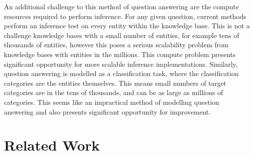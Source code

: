\noindent An additional challenge to this method of question answering are the compute resources required to perform inference. For any given question, current methods perform an inference test on every entity within the knowledge base. This is not a challenge knowledge bases with a small number of entities, for example tens of thousands of entities, however this poses a serious scalability problem from knowledge bases with entities in the millions. This compute problem presents significant opportunity for more scalable inference implementations. Similarly, question answering is modelled as a classification task, where the classification categories are the entities themselves. This means small numbers of target categories are in the tens of thousands, and can be as large as millions of categories. This seems like an impractical method of modelling question answering and also presents significant opportunity for improvement. 



\section{Related Work} %

